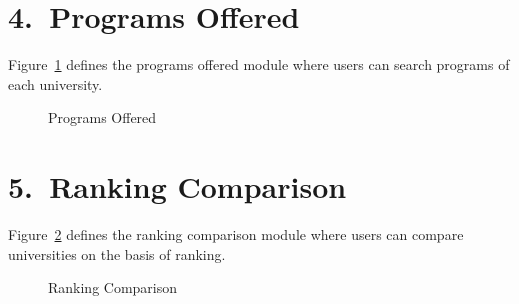 \section*{4.\ Programs Offered}

Figure~\ref{fig:programs} defines the programs offered module where users can search programs of each university.

\begin{figure}[H]
    \centering
    \caption{Programs Offered}
    \label{fig:programs}
\end{figure}

\section*{5.\ Ranking Comparison}

Figure~\ref{fig:ranking} defines the ranking comparison module where users can compare universities on the basis of ranking.

\begin{figure}[H]
    \centering
    \caption{Ranking Comparison}
    \label{fig:ranking}
\end{figure}
